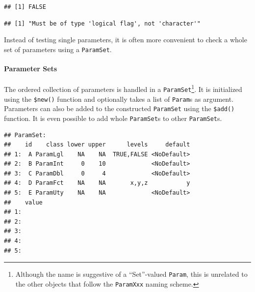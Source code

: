 \documentclass[]{article}
\newenvironment{Shaded}{\begin{snugshade}}{\end{snugshade}}
\newcommand{\KeywordTok}[1]{\textcolor[rgb]{0.13,0.29,0.53}{\textbf{#1}}}
\newcommand{\NormalTok}[1]{#1}
\newcommand{\OperatorTok}[1]{\textcolor[rgb]{0.81,0.36,0.00}{\textbf{#1}}}
\newcommand{\StringTok}[1]{\textcolor[rgb]{0.31,0.60,0.02}{#1}}
\let\oldparagraph\paragraph
\renewcommand{\paragraph}[1]{\oldparagraph{#1}\mbox{}}
\renewenvironment{Shaded} {\begin{snugshade}\small} {\end{snugshade}}
\begin{document}
\begin{verbatim}
## [1] FALSE
\end{verbatim}

\begin{Shaded}
\end{Shaded}

\begin{verbatim}
## [1] "Must be of type 'logical flag', not 'character'"
\end{verbatim}

Instead of testing single parameters, it is often more convenient to check a whole set of parameters using a \texttt{ParamSet}.

\hypertarget{parameter-sets}{%
\paragraph{Parameter Sets}\label{parameter-sets}}

The ordered collection of parameters is handled in a \texttt{ParamSet}\footnote{Although the name is suggestive of a ``Set''-valued \texttt{Param}, this is unrelated to the other objects that follow the \texttt{ParamXxx} naming scheme.}.
It is initialized using the \texttt{\$new()} function and optionally takes a list of \texttt{Param}s as argument.
Parameters can also be added to the constructed \texttt{ParamSet} using the \texttt{\$add()} function.
It is even possible to add whole \texttt{ParamSet}s to other \texttt{ParamSet}s.

\begin{Shaded}
\end{Shaded}

\begin{verbatim}
## ParamSet: 
##    id    class lower upper      levels     default
## 1:  A ParamLgl    NA    NA  TRUE,FALSE <NoDefault>
## 2:  B ParamInt     0    10             <NoDefault>
## 3:  C ParamDbl     0     4             <NoDefault>
## 4:  D ParamFct    NA    NA       x,y,z           y
## 5:  E ParamUty    NA    NA             <NoDefault>
##    value
## 1:      
## 2:      
## 3:      
## 4:      
## 5:
\end{verbatim}
\end{document}
